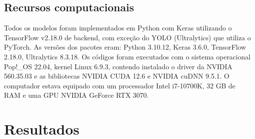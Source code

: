 \documentclass[12pt]{article}
\begin{document}


\subsection{Recursos computacionais}
\label{sec:resources}

Todos os modelos foram implementados em Python com Keras utilizando o TensorFlow v2.18.0 de backend, com exceção do YOLO (Ultralytics) que utiliza o PyTorch. As versões dos pacotes eram: Python 3.10.12, Keras 3.6.0, TensorFlow 2.18.0, Ultralytics 8.3.18.
Os códigos foram executados com o sistema operacional Pop!\_OS 22.04, kernel Linux 6.9.3, contendo instalado o driver da NVIDIA 560.35.03 e as bibliotecas NVIDIA CUDA 12.6 e NVIDIA cuDNN 9.5.1.
O computador estava equipado com um processador Intel i7-10700K, 32 GB de RAM e uma GPU NVIDIA GeForce RTX 3070.

\section{Resultados}
\label{sec:results}









\end{document}

